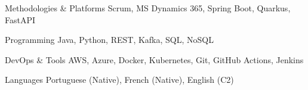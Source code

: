 

\begin{cvskills}

  \cvskill
    {Methodologies \& Platforms} %
    {Scrum, MS Dynamics 365, Spring Boot, Quarkus, FastAPI} %

  \cvskill
    {Programming} %
    {Java, Python, REST, Kafka, SQL, NoSQL} %

  \cvskill
    {DevOps \& Tools} %
    {AWS, Azure, Docker, Kubernetes, Git, GitHub Actions, Jenkins} %

  \cvskill
    {Languages} %
    {Portuguese (Native), French (Native), English (C2)} %

\end{cvskills}
